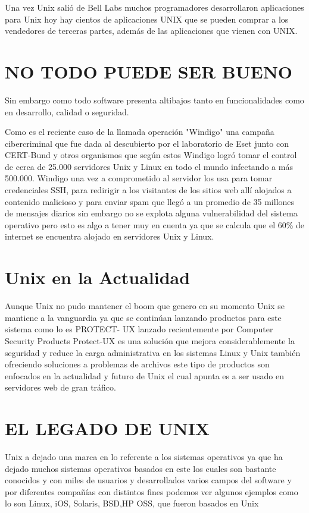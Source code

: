 Una vez Unix salió de Bell Labs muchos programadores desarrollaron aplicaciones para Unix hoy hay cientos de aplicaciones UNIX que se pueden comprar a los vendedores de 
terceras partes, además de las aplicaciones que vienen con UNIX.


\section*{NO TODO PUEDE SER BUENO}
Sin embargo como todo software presenta altibajos tanto en funcionalidades como en desarrollo, calidad o seguridad.
                                           
Como es el reciente caso de la llamada operación "Windigo" una campaña cibercriminal que fue dada al descubierto por el laboratorio de Eset junto con CERT-Bund y otros 
organismos que según estos Windigo logró tomar el control de cerca de 25.000 servidores Unix y Linux en todo el mundo infectando a más 500.000. Windigo una vez a 
comprometido al servidor los usa para tomar credenciales SSH, para redirigir a  los visitantes de los sitios web allí alojados a contenido malicioso  y para enviar spam que 
llegó a un promedio de 35 millones de mensajes diarios sin embargo no se explota alguna vulnerabilidad del sistema operativo pero esto es algo a tener muy en cuenta ya que 
se calcula que el 60\% de internet se encuentra alojado en servidores Unix y Linux.

\section*{Unix en la Actualidad}
Aunque Unix no pudo mantener el boom que genero en su momento Unix se mantiene a la vanguardia ya que se continúan lanzando productos para este sistema  como lo es PROTECT-
UX lanzado recientemente por  Computer Security Products Protect-UX es una solución que mejora considerablemente la seguridad y reduce la carga administrativa en los 
sistemas Linux y Unix también ofreciendo soluciones a problemas de archivos este tipo de productos son enfocados en la actualidad y futuro de Unix el cual apunta es a ser  
usado en servidores web de gran tráfico.

\section*{EL LEGADO DE UNIX}
Unix  a dejado una marca en lo referente a los sistemas operativos ya que ha dejado  muchos sistemas operativos basados en este los cuales son bastante conocidos y con 
miles de usuarios y desarrollados varios campos del software y por diferentes compañías con distintos fines  podemos ver algunos ejemplos como lo son Linux, iOS, Solaris, 
BSD,HP OSS, que fueron basados en Unix


 